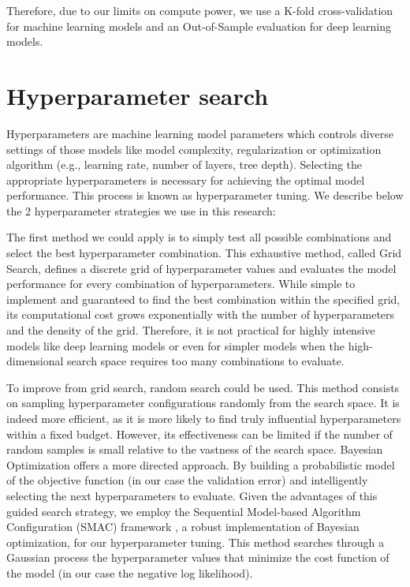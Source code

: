 \documentclass[12pt,a4paper]{book}
\begin{document}
Therefore, due to our limits on compute power, we use a K-fold cross-validation for machine learning models and an Out-of-Sample evaluation for deep learning models.

\section{Hyperparameter search}
Hyperparameters are machine learning model parameters which controls diverse settings of those models like model complexity, regularization or optimization algorithm (e.g., learning rate, number of layers, tree depth). Selecting the appropriate hyperparameters is necessary for achieving the optimal model performance. This process is known as hyperparameter tuning. We describe below the 2 hyperparameter strategies we use in this research:

The first method we could apply is to simply test all possible combinations and select the best hyperparameter combination. This exhaustive method, called Grid Search, defines a discrete grid of hyperparameter values and evaluates the model performance for every combination of hyperparameters. While simple to implement and guaranteed to find the best combination within the specified grid, its computational cost grows exponentially with the number of hyperparameters and the density of the grid. Therefore, it is not practical for highly intensive models like deep learning models or even for simpler models when the high-dimensional search space requires too many combinations to evaluate.

To improve from grid search, random search \citep{Bergstra2012} could be used. This method consists on sampling hyperparameter configurations randomly from the search space. It is indeed more efficient, as it is more likely to find truly influential hyperparameters within a fixed budget. However, its effectiveness can be limited if the number of random samples is small relative to the vastness of the search space. Bayesian Optimization \citep{humanout} offers a more directed approach. By building a probabilistic model of the objective function (in our case the validation error) and intelligently selecting the next hyperparameters to evaluate. Given the advantages of this guided search strategy, we employ the Sequential Model-based Algorithm Configuration (SMAC) framework \citep{JMLR:v23:21-0888}, a robust implementation of Bayesian optimization, for our hyperparameter tuning. This method searches through a Gaussian process the hyperparameter values that minimize the cost function of the model (in our case the negative log likelihood). 
\end{document}
